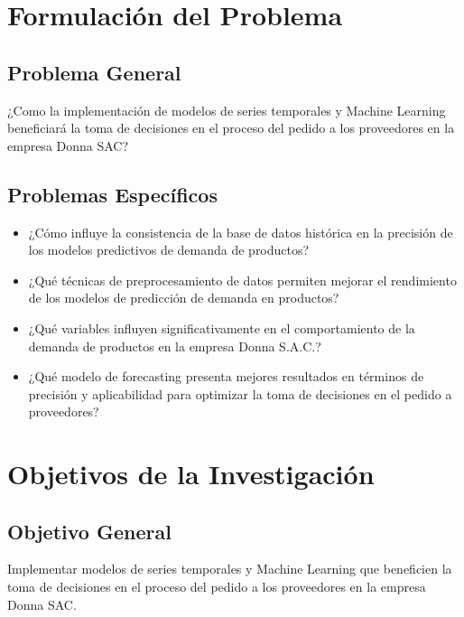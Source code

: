 \section{Formulación del Problema}

%
%

\subsection{Problema General}
\newcommand{\ProblemaGeneral}{
	¿Como la implementación de modelos de series temporales y Machine Learning beneficiará la toma de decisiones en el proceso del pedido a los proveedores en la empresa Donna SAC?  
}
\ProblemaGeneral
\subsection{Problemas Espec\'{i}ficos}
\newcommand{\Pbone}{
¿Cómo influye la consistencia de la base de datos histórica en la precisión de los modelos predictivos de demanda de productos?
}
\newcommand{\Pbtwo}{
¿Qué técnicas de preprocesamiento de datos permiten mejorar el rendimiento de los modelos de predicción de demanda en productos?
}
\newcommand{\Pbthree}{
¿Qué variables influyen significativamente en el comportamiento de la demanda de productos en la empresa Donna S.A.C.?
}
\newcommand{\Pbfour}{
¿Qué modelo de forecasting presenta mejores resultados en términos de precisión y aplicabilidad para optimizar la toma de decisiones en el pedido a proveedores?		
}

\begin{itemize}
	\item \Pbone
	\item \Pbtwo
	\item \Pbthree
	\item \Pbfour
\end{itemize}

\section{Objetivos de la Investigación}
\subsection{Objetivo General}
\newcommand{\ObjetivoGeneral}{
Implementar modelos de series temporales y Machine Learning que beneficien la toma de decisiones en el proceso del pedido a los proveedores en la empresa Donna SAC.

}
\ObjetivoGeneral
